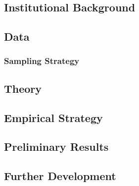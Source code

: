 \documentclass[11pt]{article}
\begin{document}
\subsection{Institutional Background} \label{subsec:background_paper3}

\subsection{Data} \label{subsec:data_paper3}

\subsubsection{Sampling Strategy} \label{subsec:sampling_paper3}





\subsection{Theory} \label{subsec:theory_paper3}

\subsection{Empirical Strategy} \label{subsec:methods_paper3}

\subsection{Preliminary Results} \label{subsec:results_paper3}







\subsection{Further Development} \label{subsec:conclusion_paper3}

\clearpage

% 
% 
\end{document}
